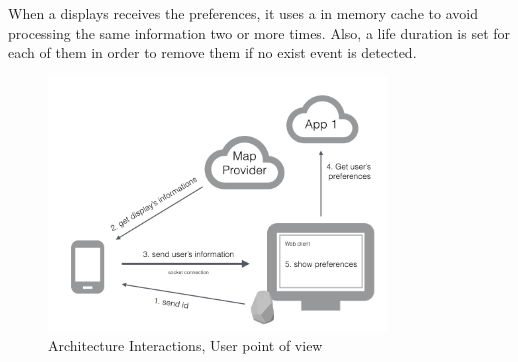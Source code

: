 \documentclass[]{usiinfbachelorproject}
\begin{document}
When a displays receives the preferences, it uses a in memory cache to avoid processing the same information two or more times. Also, a life duration is set for each of them in order to remove them if no exist event is detected.
\begin{figure}[H]
  \centering
  \includegraphics[width=0.8\textwidth]{./images/elements_interactions_user.jpeg}
  \caption{Architecture Interactions, User point of view}

\end{figure} 
\end{document}
